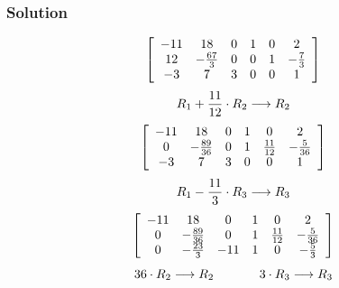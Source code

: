 \documentclass[xcolor=dvipsnames]{beamer}
\begin{document}
\begin{frame}
  \frametitle{Solution}
  \begin{equation}
    \label{eq:moogiego}
    \left[
      \begin{array}{cccccc}
        -11 & 18  & 0 & 1 & 0 & 2 \\
         12 & -\frac{67}{3} & 0  & 0 & 1 & -\frac{7}{3} \\
        -3 & 7  & 3  & 0 & 0 & 1
      \end{array}\right]\notag
  \end{equation}
  \begin{equation}
    \label{eq:hohpheip}
    R_{1}+\frac{11}{12}\cdot{}R_{2}\longrightarrow{}R_{2}\notag
  \end{equation}
  \begin{equation}
    \label{eq:cahseequ}
    \left[
      \begin{array}{cccccc}
        -11 & 18  & 0 & 1 & 0 & 2 \\
         0 & -\frac{89}{36} & 0  & 1 & \frac{11}{12} & -\frac{5}{36} \\
        -3 & 7  & 3  & 0 & 0 & 1
      \end{array}\right]\notag
  \end{equation}
  \begin{equation}
    \label{eq:kiecaesh}
    R_{1}-\frac{11}{3}\cdot{}R_{3}\longrightarrow{}R_{3}\notag
  \end{equation}
  \begin{equation}
    \label{eq:xeotheem}
    \left[
      \begin{array}{cccccc}
        -11 & 18  & 0 & 1 & 0 & 2 \\
         0 & -\frac{89}{36} & 0  & 1 & \frac{11}{12} & -\frac{5}{36} \\
        0 & -\frac{23}{3}  & -11  & 1 & 0 & -\frac{5}{3}
      \end{array}\right]\notag
  \end{equation}
  \begin{equation}
    \label{eq:ioquooxa}
    36\cdot{}R_{2}\longrightarrow{}R_{2}\hspace{.5in}3\cdot{}R_{3}\longrightarrow{}R_{3}\notag
  \end{equation}
\end{frame}
\end{document}

